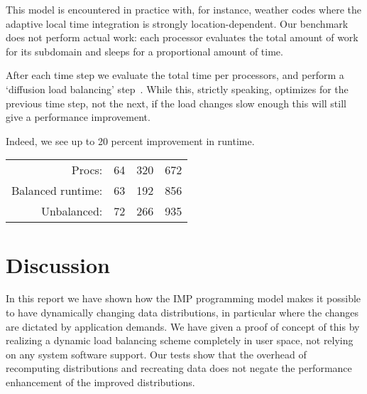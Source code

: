 \documentclass[11pt,fleqn]{article}
\begin{document}
This model is encountered in practice with, for instance, weather
codes where the adaptive local time integration is strongly
location-dependent.  Our benchmark does not perform actual work: each
processor evaluates the total amount of work for its subdomain and
sleeps for a proportional amount of time.

After each time step we evaluate the total time per processors, and
perform a `diffusion load balancing'
step~\cite{Cybenko:1989:balancing,HuBlake:diffusion1999}. While this,
strictly speaking, optimizes for the previous time step, not the next,
if the load changes slow enough this will still give a performance
improvement.

Indeed, we see up to 20 percent improvement in runtime.

\begin{tabular}{|r|r|r|r|}
  \hline
  Procs:&64&320&672\\
  Balanced runtime:&63&192&856\\
  Unbalanced:&72&266&935\\
  \hline
\end{tabular}

\section{Discussion}

In this report we have shown how the \ac{IMP} programming model makes
it possible to have dynamically changing data distributions, in
particular where the changes are dictated by application demands. We
have given a proof of concept of this by realizing a dynamic load
balancing scheme completely in user space, not relying on any system
software support. Our tests show that the overhead of recomputing
distributions and recreating data does not negate the performance
enhancement of the improved distributions.



\end{document}
